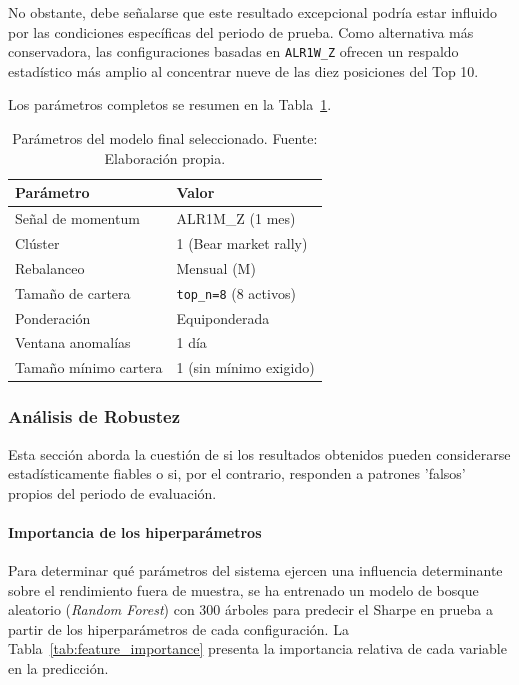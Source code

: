 No obstante, debe señalarse que este resultado excepcional
podría estar influido por las condiciones específicas del
periodo de prueba. Como alternativa más conservadora, las
configuraciones basadas en \texttt{ALR1W\_Z} ofrecen un
respaldo estadístico más amplio al concentrar nueve de las
diez posiciones del Top 10.

Los parámetros completos se resumen en la
Tabla~\ref{tab:modelo_final}.

\begin{table}[H]
\centering
\small
\begin{tabular}{ll}
\toprule
\textbf{Parámetro} & \textbf{Valor} \\
\midrule
Señal de momentum    & ALR1M\_Z (1 mes) \\
Clúster              & 1 (Bear market rally) \\
Rebalanceo           & Mensual (M) \\
Tamaño de cartera    & \texttt{top\_n=8} (8 activos) \\
Ponderación          & Equiponderada \\
Ventana anomalías    & 1 día \\
Tamaño mínimo cartera& 1 (sin mínimo exigido) \\
\bottomrule
\end{tabular}
\caption{Parámetros del modelo final seleccionado.
Fuente: Elaboración propia.}
\label{tab:modelo_final}
\end{table}


\subsubsection{Análisis de Robustez}

Esta sección aborda la cuestión de si los resultados obtenidos
pueden considerarse estadísticamente fiables o si, por el
contrario, responden a patrones 'falsos' propios del periodo de
evaluación.

\paragraph{Importancia de los hiperparámetros}

Para determinar qué parámetros del sistema ejercen una influencia
determinante sobre el rendimiento fuera de muestra, se ha
entrenado un modelo de bosque aleatorio (\textit{Random Forest})
con 300 árboles para predecir el Sharpe en prueba a partir de los
hiperparámetros de cada configuración. La
Tabla~\ref{tab:feature_importance} presenta la importancia
relativa de cada variable en la predicción.


